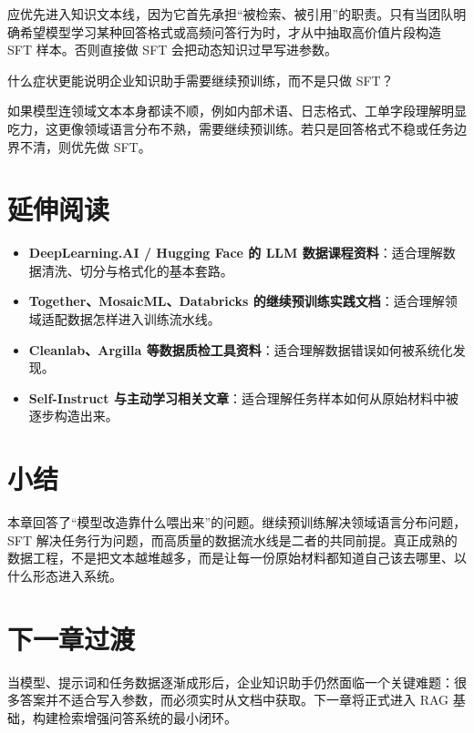 \begin{solution}
应优先进入{\heiti 知识文本线}，因为它首先承担“被检索、被引用”的职责。只有当团队明确希望模型学习某种回答格式或高频问答行为时，才从中抽取高价值片段构造 SFT 样本。否则直接做 SFT 会把动态知识过早写进参数。
\end{solution}

\begin{exercise}[继续预训练触发条件]
什么症状更能说明企业知识助手需要继续预训练，而不是只做 SFT？
\end{exercise}

\begin{solution}
如果模型{\heiti 连领域文本本身都读不顺}，例如内部术语、日志格式、工单字段理解明显吃力，这更像领域语言分布不熟，需要继续预训练。若只是回答格式不稳或任务边界不清，则优先做 SFT。
\end{solution}

\section{延伸阅读}
\begin{itemize}
  \item \textbf{DeepLearning.AI / Hugging Face 的 LLM 数据课程资料}：适合理解数据清洗、切分与格式化的基本套路。
  \item \textbf{Together、MosaicML、Databricks 的继续预训练实践文档}：适合理解领域适配数据怎样进入训练流水线。
  \item \textbf{Cleanlab、Argilla 等数据质检工具资料}：适合理解数据错误如何被系统化发现。
  \item \textbf{Self-Instruct 与主动学习相关文章}：适合理解任务样本如何从原始材料中被逐步构造出来。
\end{itemize}

\section{小结}
本章回答了“模型改造靠什么喂出来”的问题。继续预训练解决领域语言分布问题，SFT 解决任务行为问题，而高质量的数据流水线是二者的共同前提。真正成熟的数据工程，不是把文本越堆越多，而是让每一份原始材料都知道自己该去哪里、以什么形态进入系统。

\section{下一章过渡}
当模型、提示词和任务数据逐渐成形后，企业知识助手仍然面临一个关键难题：很多答案并不适合写入参数，而必须实时从文档中获取。下一章将正式进入 RAG 基础，构建检索增强问答系统的最小闭环。
